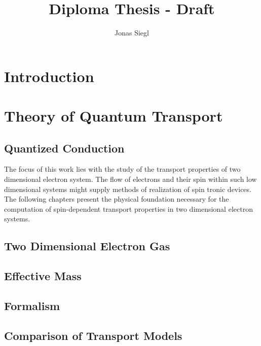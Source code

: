 
\author{Jonas Siegl}
\title{Diploma Thesis - Draft}




\maketitle
% 

\clearpage
\thispagestyle{empty}
\mbox{}
\clearpage
\thispagestyle{plain} %
\tableofcontents
\clearpage
\section{Introduction}
\clearpage
\section{Theory of Quantum Transport}
  \subsection{Quantized Conduction}
  
The focus of this work lies with the study of the transport properties of two dimensional electron system. The flow of electrons and their spin within such low dimensional systems might supply methods of realization of spin tronic devices.
 The following chapters present the physical foundation necessary for the computation of spin-dependent transport properties in two dimensional electron systems.
  \subsection{Two Dimensional Electron Gas}
    
      \subsection{Effective Mass \hamil{}}
	
	
  \subsection{\cgfnc{} Formalism}
  
  \subsection{Comparison of Transport Models}
  
\clearpage
